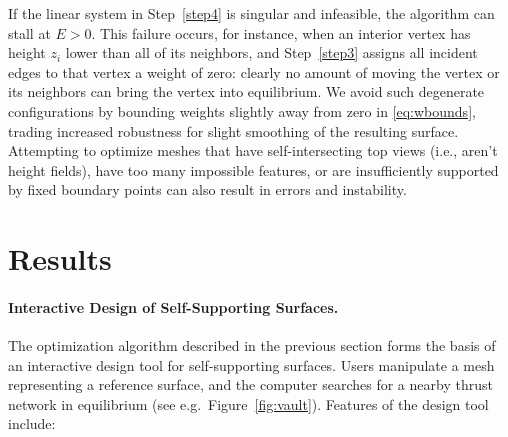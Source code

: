 \documentclass[review]{acmsiggraph}
\begin{document}
If the linear system in Step~\ref{step4} is singular and infeasible, the 
algorithm can stall at $E > 0$. This failure occurs, for instance, when an 
interior vertex has height $z_i$ lower than all of its neighbors, and 
Step~\ref{step3} assigns all incident edges to that vertex a weight of 
zero: clearly no amount of moving the vertex or its neighbors can bring 
the vertex into equilibrium. We avoid such degenerate configurations by 
bounding weights slightly away from zero in \eqref{eq:wbounds}, trading 
increased robustness for slight smoothing of the resulting surface. Attempting
to optimize meshes that have self-intersecting top views (i.e., aren't height fields),
have too many impossible features, or are insufficiently supported by fixed
boundary points can also result in errors and instability.





\section{Results}
\label{sec:design}

\paragraph{Interactive Design of Self-Supporting Surfaces.}

The optimization algorithm described in the previous section forms the 
basis of an interactive design tool for self-supporting surfaces. Users 
manipulate a mesh representing a reference surface, and the computer 
searches for a nearby thrust network in equilibrium (see e.g.\ 
Figure~\ref{fig:vault}). Features of the design tool include:
\end{document}
